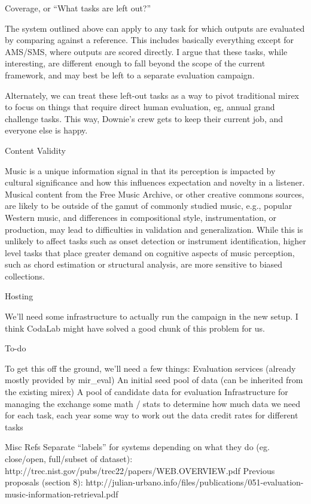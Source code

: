 \documentclass{article}
\begin{document}
Coverage, or “What tasks are left out?”

The system outlined above can apply to any task for which outputs are evaluated by comparing against a reference.  This includes basically everything except for AMS/SMS, where outputs are scored directly.  I argue that these tasks, while interesting, are different enough to fall beyond the scope of the current framework, and may best be left to a separate evaluation campaign.

Alternately, we can treat these left-out tasks as a way to pivot traditional mirex to focus on things that require direct human evaluation, eg, annual grand challenge tasks.  This way, Downie’s crew gets to keep their current job, and everyone else is happy.

Content Validity

Music is a unique information signal in that its perception is impacted by cultural significance and how this influences expectation and novelty in a listener. Musical content from the Free Music Archive, or other creative commons sources, are likely to be outside of the gamut of commonly studied music, e.g., popular Western music, and differences in compositional style, instrumentation, or production, may lead to difficulties in validation and generalization. While this is unlikely to affect tasks such as onset detection or instrument identification, higher level tasks that place greater demand on cognitive aspects of music perception, such as chord estimation or structural analysis, are more sensitive to biased collections. 

Hosting

We’ll need some infrastructure to actually run the campaign in the new setup.  I think CodaLab might have solved a good chunk of this problem for us.

To-do

To get this off the ground, we’ll need a few things:
Evaluation services (already mostly provided by mir_eval)
An initial seed pool of data (can be inherited from the existing mirex)
A pool of candidate data for evaluation
Infrastructure for managing the exchange
some math / stats to determine how much data we need for each task, each year
some way to work out the data credit rates for different tasks

Misc Refs
Separate “labels” for systems depending on what they do (eg. close/open, full/subset of dataset): http://trec.nist.gov/pubs/trec22/papers/WEB.OVERVIEW.pdf 
Previous proposals (section 8): http://julian-urbano.info/files/publications/051-evaluation-music-information-retrieval.pdf



\end{document}
